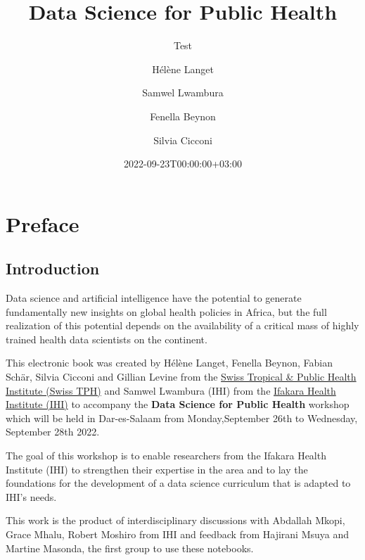 \documentclass[
  letterpaper,
  DIV=11,
  numbers=noendperiod]{scrreprt}
\title{Data Science for Public Health}
\subtitle{Test}
\author{Hélène Langet \and Samwel Lwambura \and Fenella
Beynon \and Silvia Cicconi}
\date{2022-09-23T00:00:00+03:00}
\renewcommand*\contentsname{Table of contents}
\newcommand\contentsname{Table of contents}
\begin{document}
\maketitle
\ifdefined\Shaded\renewenvironment{Shaded}{\begin{tcolorbox}[breakable, borderline west={3pt}{0pt}{shadecolor}, sharp corners, frame hidden, enhanced, boxrule=0pt, interior hidden]}{\end{tcolorbox}}\fi

\renewcommand*\contentsname{Table of contents}
{
\hypersetup{linkcolor=}
\setcounter{tocdepth}{2}
\tableofcontents
}

\hypertarget{preface}{%
\chapter*{Preface}\label{preface}}

\hypertarget{introduction}{%
\section*{Introduction}\label{introduction}}

Data science and artificial intelligence have the potential to generate
fundamentally new insights on global health policies in Africa, but the
full realization of this potential depends on the availability of a
critical mass of highly trained health data scientists on the continent.

This electronic book was created by Hélène Langet, Fenella Beynon,
Fabian Schär, Silvia Cicconi and Gillian Levine from the
\href{https://www.swisstph.ch}{Swiss Tropical \& Public Health Institute
(Swiss TPH)} and Samwel Lwambura (IHI) from the
\href{https://ihi.or.tz/}{Ifakara Health Institute (IHI)} to accompany
the \textbf{Data Science for Public Health} workshop which will be held
in Dar-es-Salaam from Monday,September 26th to Wednesday, September 28th
2022.

The goal of this workshop is to enable researchers from the Ifakara
Health Institute (IHI) to strengthen their expertise in the area and to
lay the foundations for the development of a data science curriculum
that is adapted to IHI's needs.

This work is the product of interdisciplinary discussions with Abdallah
Mkopi, Grace Mhalu, Robert Moshiro from IHI and feedback from Hajirani
Msuya and Martine Masonda, the first group to use these notebooks.
\end{document}
